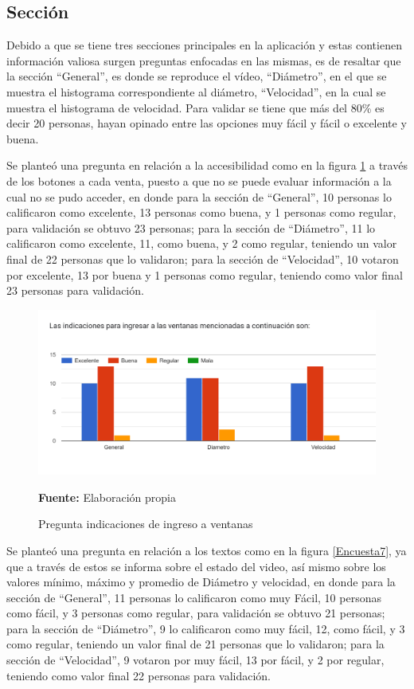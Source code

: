 \documentclass[12pt,twocolumn,a4paper]{article}
\begin{document}
\subsection{Sección}

Debido a que se tiene tres secciones principales en la aplicación y estas contienen información valiosa surgen preguntas enfocadas en las mismas, es de resaltar que la sección “General”, es  donde se reproduce el vídeo, “Diámetro”, en el que se muestra el histograma correspondiente al diámetro, “Velocidad”, en la cual se muestra el histograma de velocidad. Para validar se tiene que más del 80\%  es decir 20 personas, hayan opinado entre las opciones muy fácil y fácil o excelente y buena.

Se planteó una pregunta en relación a la accesibilidad como en la figura \ref{Encuesta6} a través de los botones a cada venta, puesto a que no se puede evaluar información a la cual no se pudo acceder, en donde para la sección de “General”, 10 personas lo calificaron como excelente, 13 personas como buena, y 1 personas como regular, para validación se obtuvo 23 personas; para la sección de “Diámetro”, 11 lo calificaron como excelente, 11, como  buena, y 2 como regular, teniendo un valor final de 22 personas que lo validaron; para la sección de “Velocidad”, 10 votaron por excelente, 13 por  buena y 1 personas como regular, teniendo como valor final 23 personas para validación.

\begin{figure}
	\centering
	\includegraphics[scale=0.2]{Encuesta6.png}
	\caption{Pregunta indicaciones de ingreso a ventanas} \textbf{Fuente:} Elaboración propia
	\label{Encuesta6}
\end{figure}

Se planteó una pregunta en relación a los textos como en la figura \ref{Encuesta7}, ya que a través de estos se informa sobre el estado del video, así mismo sobre los valores mínimo, máximo y promedio de Diámetro y velocidad, en donde para la sección de “General”, 11 personas lo calificaron como muy Fácil, 10 personas como fácil, y 3 personas como regular, para validación se obtuvo 21 personas; para la sección de “Diámetro”, 9 lo calificaron como muy fácil, 12, como fácil, y 3 como regular, teniendo un valor final de 21 personas que lo validaron; para la sección de “Velocidad”, 9 votaron por muy fácil, 13 por fácil, y 2 por regular, teniendo como valor final 22 personas para validación. 
\end{document}
